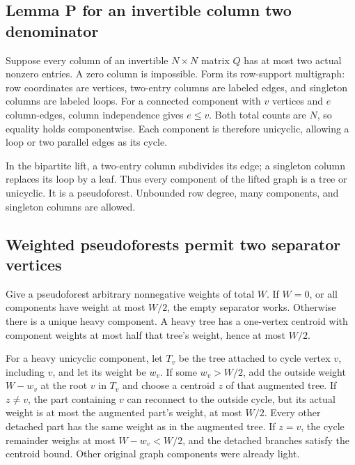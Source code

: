 \documentclass[
  11pt,
]{article}
\begin{document}
\subsection{Lemma P for an invertible column two
denominator}\label{lemma-p-for-an-invertible-column-two-denominator}

Suppose every column of an invertible \(N\times N\) matrix \(Q\) has at
most two actual nonzero entries. A zero column is impossible. Form its
row-support multigraph: row coordinates are vertices, two-entry columns
are labeled edges, and singleton columns are labeled loops. For a
connected component with \(v\) vertices and \(e\) column-edges, column
independence gives \(e\le v\). Both total counts are \(N\), so equality
holds componentwise. Each component is therefore unicyclic, allowing a
loop or two parallel edges as its cycle.

In the bipartite lift, a two-entry column subdivides its edge; a
singleton column replaces its loop by a leaf. Thus every component of
the lifted graph is a tree or unicyclic. It is a pseudoforest. Unbounded
row degree, many components, and singleton columns are allowed.

\subsection{Weighted pseudoforests permit two separator
vertices}\label{weighted-pseudoforests-permit-two-separator-vertices}

Give a pseudoforest arbitrary nonnegative weights of total \(W\). If
\(W=0\), or all components have weight at most \(W/2\), the empty
separator works. Otherwise there is a unique heavy component. A heavy
tree has a one-vertex centroid with component weights at most half that
tree's weight, hence at most \(W/2\).

For a heavy unicyclic component, let \(T_v\) be the tree attached to
cycle vertex \(v\), including \(v\), and let its weight be \(w_v\). If
some \(w_v>W/2\), add the outside weight \(W-w_v\) at the root \(v\) in
\(T_v\) and choose a centroid \(z\) of that augmented tree. If
\(z\ne v\), the part containing \(v\) can reconnect to the outside
cycle, but its actual weight is at most the augmented part's weight, at
most \(W/2\). Every other detached part has the same weight as in the
augmented tree. If \(z=v\), the cycle remainder weighs at most
\(W-w_v<W/2\), and the detached branches satisfy the centroid bound.
Other original graph components were already light.
\end{document}
